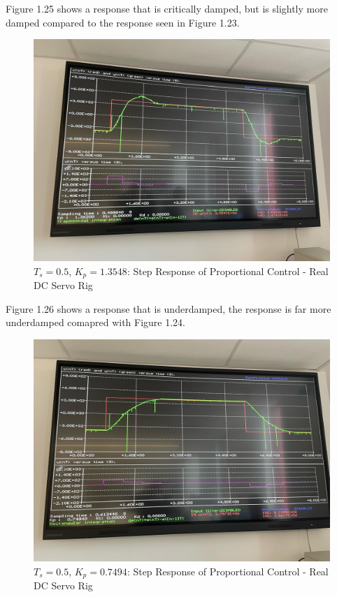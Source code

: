 \documentclass[stu, a4paper, 12pt, floatsintext]{apa7}
\numberwithin{figure}{section}
\numberwithin{table}{section}
\numberwithin{equation}{section}
\begin{document}
Figure 1.25 shows a response that is critically damped, but is slightly more damped compared to the response seen in Figure 1.23.
\begin{figure}[H]
    \caption{$T_s = 0.5$, $K_p = 1.3548$: Step Response of Proportional Control - Real DC Servo Rig}
    \label{fig:0.5_Ts_step4_step_response_1}
    \centering
    \includegraphics[width=1.1\textwidth]{pictures/task4_kp_0.5_1}
\end{figure}
Figure 1.26 shows a response that is underdamped, the response is far more underdamped comapred with Figure 1.24.
\begin{figure}[H]
    \caption{$T_s = 0.5$, $K_p = 0.7494$: Step Response of Proportional Control - Real DC Servo Rig}
    \label{fig:0.5_Ts_step4_step_response_2}
    \centering
    \includegraphics[width=1.1\textwidth]{pictures/task4_kp_0.5_2}
\end{figure}
\end{document}
